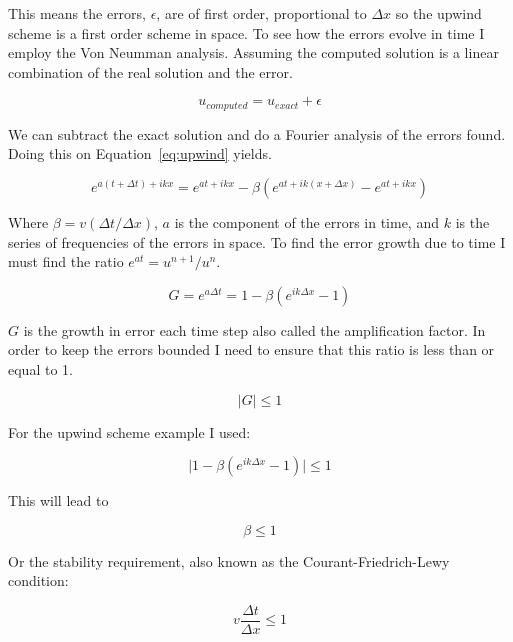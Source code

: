 \documentclass[12pt,upcase]{umlthesis}
\begin{document}
This means the errors, $\epsilon$, are of first order, proportional to $\Delta x$ so the upwind scheme is a first order scheme in space. To see how the errors evolve in time I employ the Von Neumman analysis. Assuming the computed solution is a linear combination of the real solution and the error.

\begin{equation}
	u_{computed} = u_{exact} + \epsilon
\end{equation}

We can subtract the exact solution and do a Fourier analysis of the errors found. Doing this on Equation~\ref{eq:upwind} yields.

\begin{equation}
	e^{a(t+\Delta t)+ikx} = e^{at+ikx} - \beta (e^{at + ik(x+\Delta x)}-e^{at + ikx})
\end{equation}

Where $\beta = v(\Delta t / \Delta x)$, $a$ is the component of the errors in time, and $k$ is the series of frequencies of the errors in space. To find the error growth due to time I must find the ratio $e^{at} = u^{n+1}/u^n$.

\begin{equation}
	G = e^{a\Delta t} = 1 - \beta (e^{ik\Delta x}- 1)
\end{equation}

$G$ is the growth in error each time step also called the amplification factor. In order to keep the errors bounded I need to ensure that this ratio is less than or equal to 1.

\begin{equation}
	\lvert G \rvert \leq 1
\end{equation}

For the upwind scheme example I used: 

\begin{equation}
	\lvert 1 - \beta (e^{ik\Delta x}- 1) \rvert \leq 1
\end{equation}

This will lead to

\begin{equation}
	\beta \leq 1
\end{equation}

Or the stability requirement, also known as the Courant-Friedrich-Lewy condition:

\begin{equation}
	v \frac{\Delta t}{\Delta x} \leq 1
\end{equation}
\end{document}
